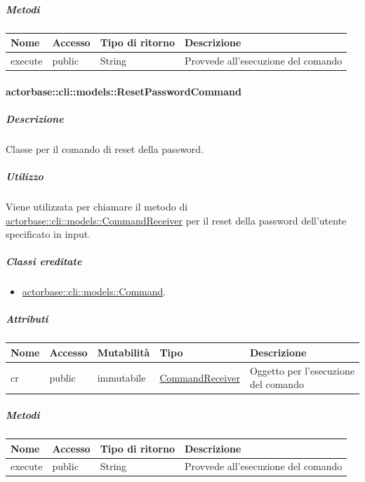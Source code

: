 \documentclass{scalatekids-article}
\begin{document}
\subparagraph{Metodi}

\begin{tabular}{| l | l | l | l |}
  \hline
  Nome & Accesso & Tipo di ritorno & Descrizione\\
  \hline
  execute & public & String & Provvede all'esecuzione del comando\\
  \hline
\end{tabular}

\paragraph{actorbase::cli::models::ResetPasswordCommand}
\label{sec:actorbase::cli::models::ResetPasswordCommand}

\subparagraph{Descrizione}

Classe per il comando di reset della password.

\subparagraph{Utilizzo}

Viene utilizzata per chiamare il metodo di
\hyperref[sec:actorbase::cli::models::CommandReceiver]{actorbase::cli::models::CommandReceiver} per il reset della password
dell'utente specificato in input.

\subparagraph{Classi ereditate}

\begin{itemize}
\item \hyperref[sec:actorbase::cli::models::Command]{actorbase::cli::models::Command}.
\end{itemize}

\subparagraph{Attributi}

\begin{tabular}{| p{1cm} | p{1.5cm} | p{2cm} | p{4cm} | p{8.5cm} |}
  \hline
  Nome & Accesso & Mutabilità & Tipo & Descrizione\\
  \hline
  cr & public & immutabile & \hyperref[sec:actorbase::cli::models::CommandReceiver]{CommandReceiver} & Oggetto per l'esecuzione del comando\\
  \hline
\end{tabular}

\subparagraph{Metodi}

\begin{tabular}{| l | l | l | l |}
  \hline
  Nome & Accesso & Tipo di ritorno & Descrizione\\
  \hline
  execute & public & String & Provvede all'esecuzione del comando\\
  \hline
\end{tabular}
\end{document}
